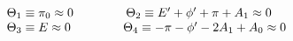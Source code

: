\begin{equation}
  \begin{array}{l}
  \Theta_1 \equiv \pi_0 \approx 0 \hspace{1.5cm} \Theta_2\equiv
  E' + \phi' + \pi + A_1 \approx 0 \\ \Theta_3 \equiv E\approx 0
  \hspace{1.5cm} \Theta_4 \equiv -\pi - \phi' - 2A_1 + A_0 \approx
  0
  \end{array}
  \label{a61}
  \end{equation}

